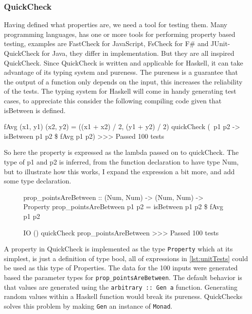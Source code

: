 \subsubsection{QuickCheck}
Having defined what properties are, we need a tool for testing them. Many programming languages, has one or more tools for performing property based testing, examples are FastCheck for JavaScript, FsCheck for F\# and JUnit-QuickCheck for Java, they differ in implementation. But they are all inspired QuickCheck\parencite{quickCheck}. Since QuickCheck is written and applicable for Haskell, it can take advantage of its typing system and pureness.
The pureness is a guarantee that the output of a function only depends on the input, this increases the reliability of the tests. The typing system for Haskell will come in handy generating test cases, to appreciate this consider the following compiling code given that isBetween is defined.
\begin{hscode}
    fAvg (x1, y1) (x2, y2) = ((x1 + x2) / 2, (y1 + y2) / 2)
    quickCheck (\ p1 p2 -> isBetween p1 p2 \$ fAvg p1 p2) 
    >>> Passed 100 tests
\end{hscode}
So here the property is expressed as the lambda passed on to quickCheck. The type of p1 and p2 is inferred, from the function declaration to have type Num, but to illustrate how this works, I expand the expression a bit more, and add some type declaration.
\begin{figure}[H]
\begin{hscode}
    prop_pointsAreBetween :: (Num, Num) -> (Num, Num) -> Property
    prop_pointsAreBetween p1 p2 = isBetween p1 p2 \$ fAvg p1 p2

    IO () 
    quickCheck prop_pointsAreBetween 
    >>> Passed 100 tests
\end{hscode}
\label{lst:qcExample}
\end{figure}
A property in QuickCheck is implemented as the type \verb|Property| which at its simplest, is just a definition of type bool, all of expressions in \ref{lst:unitTests} could be used as this type of Properties. The data for the 100 inputs were generated based the parameter types for \verb|prop_pointsAreBetween|. The default behavior is that values are generated using the \verb|arbitrary :: Gen a| function. Generating random values within a Haskell function would break its pureness. QuickChecks solves this problem by making \verb|Gen| an instance of \verb|Monad|.

